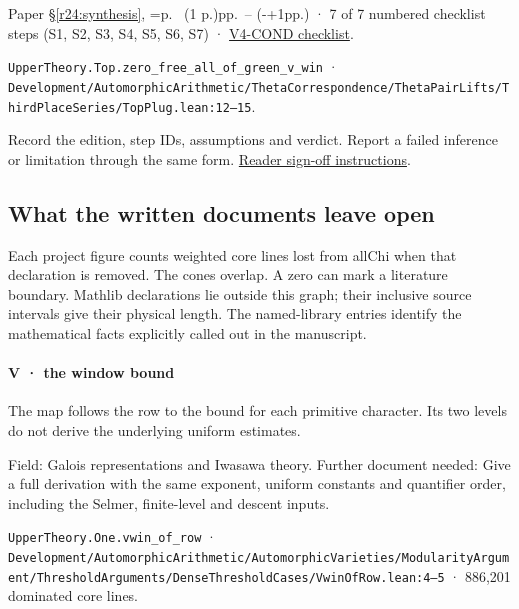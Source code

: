 Paper \S\ref{r24:synthesis}, \ifnum{}=\relax p.\ \pageref{r24:synthesis} (1 p.)\else pp.\ \pageref{r24:synthesis}--\pageref{v5:conclusion-end} (\number\numexpr{}-+1\relax pp.)\fi{} · 7 of 7 numbered checklist steps (S1, S2, S3, S4, S5, S6, S7) · \href{https://github.com/GunheeC/rh-lean-verification-atlas/blob/v0.1.0/units/V4-COND.check.md}{V4-COND checklist}.

\nolinkurl{UpperTheory.Top.zero_free_all_of_green_v_win} · \nolinkurl{Development/AutomorphicArithmetic/ThetaCorrespondence/ThetaPairLifts/ThirdPlaceSeries/TopPlug.lean:12–15}.

Record the edition, step IDs, assumptions and verdict. Report a failed inference or limitation through the same form. \href{https://github.com/GunheeC/rh-lean-verification-atlas/blob/v0.1.0/signoffs/README.md}{Reader sign-off instructions}.

\subsection{What the written documents leave open}\label{v7:q3}

Each project figure counts weighted core lines lost from allChi when that declaration is removed. The cones overlap. A zero can mark a literature boundary. Mathlib declarations lie outside this graph; their inclusive source intervals give their physical length. The named-library entries identify the mathematical facts explicitly called out in the manuscript.

\paragraph{V · the window bound}

The map follows the row to the bound for each primitive character. Its two levels do not derive the underlying uniform estimates.

Field: Galois representations and Iwasawa theory. Further document needed: Give a full derivation with the same exponent, uniform constants and quantifier order, including the Selmer, finite-level and descent inputs.

\nolinkurl{UpperTheory.One.vwin_of_row} · \nolinkurl{Development/AutomorphicArithmetic/AutomorphicVarieties/ModularityArgument/ThresholdArguments/DenseThresholdCases/VwinOfRow.lean:4–5} · 886,201 dominated core lines.

